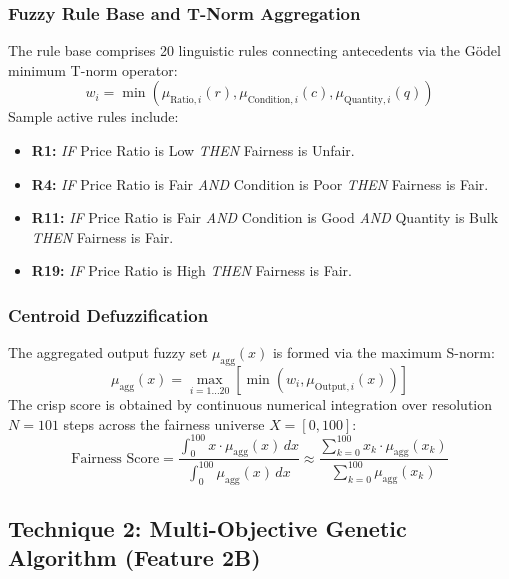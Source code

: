 \documentclass[12pt,a4paper]{article}
\begin{document}
\subsubsection{Fuzzy Rule Base and T-Norm Aggregation}
The rule base comprises 20 linguistic rules connecting antecedents via the Gödel minimum T-norm operator:
\begin{equation}
    w_i = \min\left( \mu_{\text{Ratio}, i}(r), \mu_{\text{Condition}, i}(c), \mu_{\text{Quantity}, i}(q) \right)
\end{equation}
Sample active rules include:
\begin{itemize}
    \item \textbf{R1:} \textit{IF} Price Ratio is Low \textit{THEN} Fairness is Unfair.
    \item \textbf{R4:} \textit{IF} Price Ratio is Fair \textit{AND} Condition is Poor \textit{THEN} Fairness is Fair.
    \item \textbf{R11:} \textit{IF} Price Ratio is Fair \textit{AND} Condition is Good \textit{AND} Quantity is Bulk \textit{THEN} Fairness is Fair.
    \item \textbf{R19:} \textit{IF} Price Ratio is High \textit{THEN} Fairness is Fair.
\end{itemize}

\subsubsection{Centroid Defuzzification}
The aggregated output fuzzy set $\mu_{\text{agg}}(x)$ is formed via the maximum S-norm:
\begin{equation}
    \mu_{\text{agg}}(x) = \max_{i=1 \dots 20} \left[ \min\left(w_i, \mu_{\text{Output}, i}(x)\right) \right]
\end{equation}
The crisp score is obtained by continuous numerical integration over resolution $N=101$ steps across the fairness universe $X = [0, 100]$:
\begin{equation}
    \text{Fairness Score} = \frac{\int_0^{100} x \cdot \mu_{\text{agg}}(x) \, dx}{\int_0^{100} \mu_{\text{agg}}(x) \, dx} \approx \frac{\sum_{k=0}^{100} x_k \cdot \mu_{\text{agg}}(x_k)}{\sum_{k=0}^{100} \mu_{\text{agg}}(x_k)}
\end{equation}

\subsection{Technique 2: Multi-Objective Genetic Algorithm (Feature 2B)}
\end{document}
